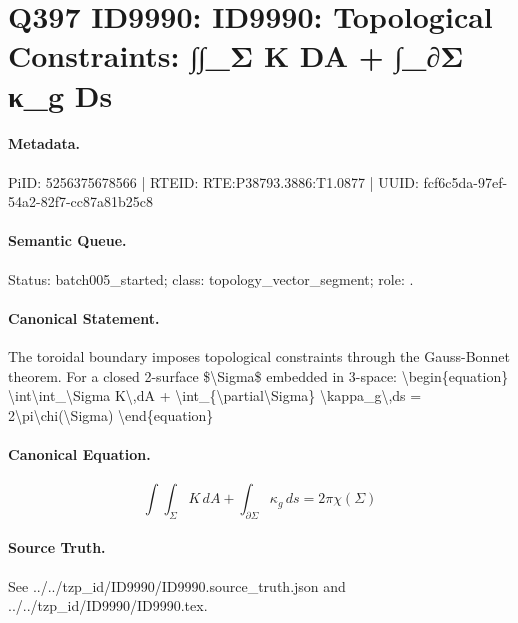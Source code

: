 \section*{Q397 ID9990: ID9990: Topological Constraints: ∫∫\_Σ K DA + ∫\_∂Σ κ\_g Ds}
\paragraph{Metadata.}
PiID: 5256375678566 | RTEID: RTE:P38793.3886:T1.0877 | UUID: fcf6c5da-97ef-54a2-82f7-cc87a81b25c8

\paragraph{Semantic Queue.}
Status: batch005\_started; class: topology\_vector\_segment; role: .

\paragraph{Canonical Statement.}
The toroidal boundary imposes topological constraints through the Gauss-Bonnet theorem. For a closed 2-surface \$\textbackslash{}Sigma\$ embedded in 3-space: \textbackslash{}begin\{equation\} \textbackslash{}int\textbackslash{}int\_\textbackslash{}Sigma K\textbackslash{},dA + \textbackslash{}int\_\{\textbackslash{}partial\textbackslash{}Sigma\} \textbackslash{}kappa\_g\textbackslash{},ds = 2\textbackslash{}pi\textbackslash{}chi(\textbackslash{}Sigma) \textbackslash{}end\{equation\}

\paragraph{Canonical Equation.}
\[
\int\int_\Sigma K\,dA + \int_{\partial\Sigma} \kappa_g\,ds = 2\pi\chi(\Sigma)
\]

\paragraph{Source Truth.}
See ../../tzp\_id/ID9990/ID9990.source\_truth.json and ../../tzp\_id/ID9990/ID9990.tex.
